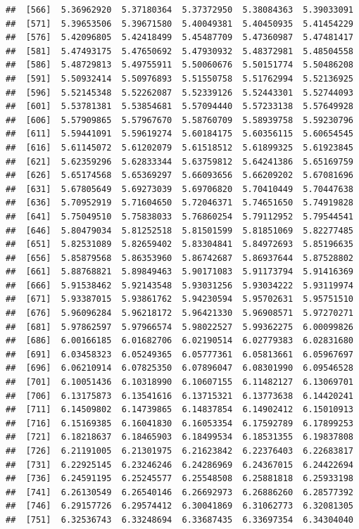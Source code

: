 \documentclass[
  11pt]{report}
\begin{document}
\begin{itemize}
\begin{verbatim}
##  [566]  5.36962920  5.37180364  5.37372950  5.38084363  5.39033091
##  [571]  5.39653506  5.39671580  5.40049381  5.40450935  5.41454229
##  [576]  5.42096805  5.42418499  5.45487709  5.47360987  5.47481417
##  [581]  5.47493175  5.47650692  5.47930932  5.48372981  5.48504558
##  [586]  5.48729813  5.49755911  5.50060676  5.50151774  5.50486208
##  [591]  5.50932414  5.50976893  5.51550758  5.51762994  5.52136925
##  [596]  5.52145348  5.52262087  5.52339126  5.52443301  5.52744093
##  [601]  5.53781381  5.53854681  5.57094440  5.57233138  5.57649928
##  [606]  5.57909865  5.57967670  5.58760709  5.58939758  5.59230796
##  [611]  5.59441091  5.59619274  5.60184175  5.60356115  5.60654545
##  [616]  5.61145072  5.61202079  5.61518512  5.61899325  5.61923845
##  [621]  5.62359296  5.62833344  5.63759812  5.64241386  5.65169759
##  [626]  5.65174568  5.65369297  5.66093656  5.66209202  5.67081696
##  [631]  5.67805649  5.69273039  5.69706820  5.70410449  5.70447638
##  [636]  5.70952919  5.71604650  5.72046371  5.74651650  5.74919828
##  [641]  5.75049510  5.75838033  5.76860254  5.79112952  5.79544541
##  [646]  5.80479034  5.81252518  5.81501599  5.81851069  5.82277485
##  [651]  5.82531089  5.82659402  5.83304841  5.84972693  5.85196635
##  [656]  5.85879568  5.86353960  5.86742687  5.86937644  5.87528802
##  [661]  5.88768821  5.89849463  5.90171083  5.91173794  5.91416369
##  [666]  5.91538462  5.92143548  5.93031256  5.93034222  5.93119974
##  [671]  5.93387015  5.93861762  5.94230594  5.95702631  5.95751510
##  [676]  5.96096284  5.96218172  5.96421330  5.96908571  5.97270271
##  [681]  5.97862597  5.97966574  5.98022527  5.99362275  6.00099826
##  [686]  6.00166185  6.01682706  6.02190514  6.02779383  6.02831680
##  [691]  6.03458323  6.05249365  6.05777361  6.05813661  6.05967697
##  [696]  6.06210914  6.07825350  6.07896047  6.08301990  6.09546528
##  [701]  6.10051436  6.10318990  6.10607155  6.11482127  6.13069701
##  [706]  6.13175873  6.13541616  6.13715321  6.13773638  6.14420241
##  [711]  6.14509802  6.14739865  6.14837854  6.14902412  6.15010913
##  [716]  6.15169385  6.16041830  6.16053354  6.17592789  6.17899253
##  [721]  6.18218637  6.18465903  6.18499534  6.18531355  6.19837808
##  [726]  6.21191005  6.21301975  6.21623842  6.22376403  6.22683817
##  [731]  6.22925145  6.23246246  6.24286969  6.24367015  6.24422694
##  [736]  6.24591195  6.25245577  6.25548508  6.25881818  6.25933198
##  [741]  6.26130549  6.26540146  6.26692973  6.26886260  6.28577392
##  [746]  6.29157726  6.29574412  6.30041869  6.31062773  6.32081305
##  [751]  6.32536743  6.33248694  6.33687435  6.33697354  6.34304040

\end{verbatim}
\end{itemize}
\end{document}
